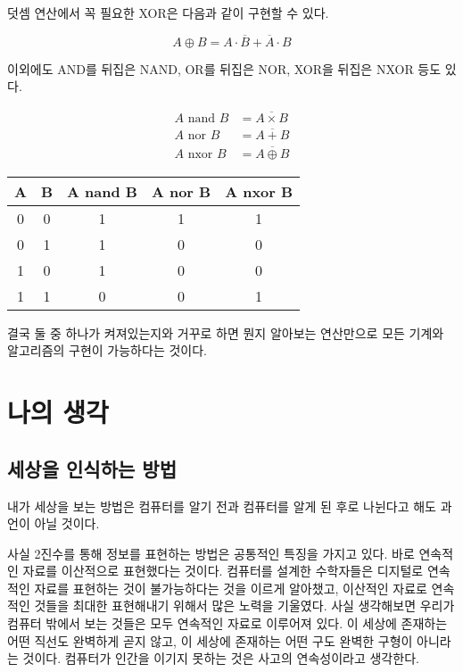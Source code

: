 \documentclass{article}
\begin{document}
덧셈 연산에서 꼭 필요한 XOR은 다음과 같이 구현할 수 있다.

$$
A \oplus B = {A} \cdot \overline B + \overline A \cdot B
$$

이외에도 AND를 뒤집은 NAND, OR를 뒤집은 NOR, XOR을 뒤집은 NXOR 등도 있다.

$$
\begin{aligned}
    A \text{ nand } B &= \overline{A \times B} \\
    A \text{ nor } B &= \overline{A + B} \\
    A \text{ nxor } B &= \overline{A \oplus B}
\end{aligned}
$$

\begin{center}
    \begin{tabular}{cc|ccc}
        A & B & A nand B & A nor B & A nxor B \\
        \hline
        0 & 0 & 1 & 1 & 1 \\
        0 & 1 & 1 & 0 & 0 \\
        1 & 0 & 1 & 0 & 0 \\
        1 & 1 & 0 & 0 & 1
    \end{tabular}
\end{center}

결국 둘 중 하나가 켜져있는지와 거꾸로 하면 뭔지 알아보는 연산만으로
모든 기계와 알고리즘의 구현이 가능하다는 것이다.

\section{나의 생각}

\subsection{세상을 인식하는 방법}

내가 세상을 보는 방법은 컴퓨터를 알기 전과 컴퓨터를 알게 된 후로 나뉜다고 해도 과언이 아닐 것이다.

사실 2진수를 통해 정보를 표현하는 방법은 공통적인 특징을 가지고 있다.
바로 연속적인 자료를 이산적으로 표현했다는 것이다.
컴퓨터를 설계한 수학자들은 디지털로 연속적인 자료를 표현하는 것이 불가능하다는 것을 이르게 알아챘고,
이산적인 자료로 연속적인 것들을 최대한 표현해내기 위해서 많은 노력을 기울였다.
사실 생각해보면 우리가 컴퓨터 밖에서 보는 것들은 모두 연속적인 자료로 이루어져 있다.
이 세상에 존재하는 어떤 직선도 완벽하게 곧지 않고,
이 세상에 존재하는 어떤 구도 완벽한 구형이 아니라는 것이다.
컴퓨터가 인간을 이기지 못하는 것은 사고의 연속성이라고 생각한다.
\end{document}
